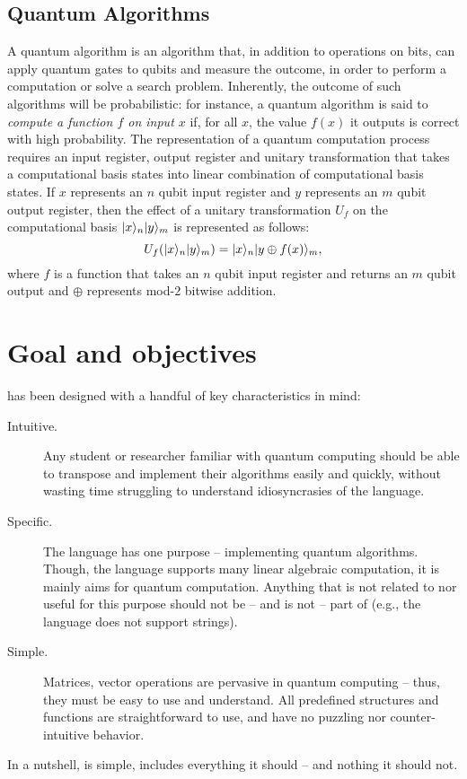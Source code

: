 \subsection{Quantum Algorithms}
A quantum algorithm is an algorithm that, in addition to operations on bits, can apply quantum gates to qubits and measure the outcome, in order to perform a computation or solve a search problem. Inherently, the outcome of such algorithms will be probabilistic: for instance, a quantum algorithm is said to \emph{compute a function $f$ on input $x$} if, for all $x$, the value $f(x)$ it outputs is correct with high probability.
  The representation of a quantum computation process requires an input register, output register and unitary transformation that takes a computational basis states into linear combination of computational basis states. If $x$ represents an $n$ qubit input register and $y$ represents an $m$ qubit output register, then the effect of a unitary transformation $U_f$ on the computational basis $|x\rangle_n|y\rangle_m$ is represented as follows:
	\begin{equation}
	U_f(|x\rangle_n|y\rangle_m)=|x\rangle_n|y\oplus f(x)\rangle_m,
	\end{equation}
	where $f$ is a function that takes an $n$ qubit input register and returns an $m$ qubit output and $\oplus$ represents mod-$2$ bitwise addition.

\section{Goal and objectives}

\QL has been designed with a handful of key characteristics in mind:
\begin{description}
  \item[Intuitive.] Any student or researcher familiar with quantum computing should be able to transpose and implement their algorithms easily and quickly, without wasting time struggling to understand idiosyncrasies of the language. 
  \item[Specific.] The language has one purpose -- implementing quantum algorithms. Though, the language supports many linear algebraic computation, it is mainly aims for quantum computation. Anything that is not related to nor useful for this purpose should not be -- and is not -- part of \QL (e.g., the language does not support strings).
  \item[Simple.] Matrices, vector operations are pervasive in quantum computing -- thus, they must be easy to use and understand. All predefined structures and functions are straightforward to use, and have no puzzling nor counter-intuitive behavior.
\end{description}
In a nutshell, \QL is simple, includes everything it should -- and nothing it should not.
